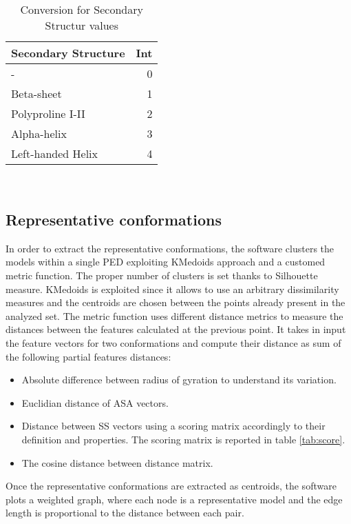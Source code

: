 \begin{table}
\begin{center}
\begin{tabular}{lr}
Secondary Structure & Int \\
\hline
- & 0\\
\hline
Beta-sheet & 1\\
\hline
Polyproline I-II & 2\\
\hline
Alpha-helix & 3\\
\hline
Left-handed Helix & 4\\
\end{tabular}
\end{center}
\caption{Conversion for Secondary Structur values}~\label{tab:ss}
\end{table}

\subsection{Representative conformations} 
In order to extract the representative conformations, the software clusters the models within a single PED exploiting KMedoids approach and a customed metric function. The proper number of clusters is set thanks to Silhouette measure. 
KMedoids is exploited since it allows to use an arbitrary dissimilarity measures and the centroids are chosen between the points already present in the analyzed set. 
The metric function uses different distance metrics to measure the distances between the features calculated at the previous point. It takes in input the feature vectors for two conformations and compute their distance as sum of the following partial features distances:
\begin{itemize}
\item Absolute difference between radius of gyration to understand its variation.
\item Euclidian distance of ASA vectors.
\item Distance between SS vectors using a scoring matrix accordingly to their definition and properties. The scoring matrix is reported in table \ref{tab:score}. 
\item The cosine distance between distance matrix. 
\end{itemize}

Once the representative conformations are extracted as centroids, the software plots a weighted graph, where each node is a representative model and the edge length is proportional to the distance between each pair. 

